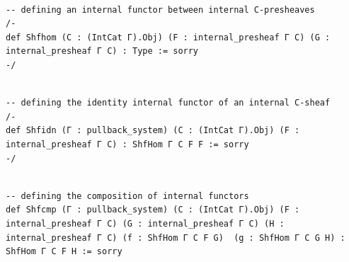 \documentclass{book}
\theoremstyle{definition}
\newcounter{lcounter}
\begin{document}
\begin{center}
\begin{tcolorbox}[width=5in,colback={white},title={\begin{center}\texttt{Lean \thelcounter} \addtocounter{lcounter}{1}  \end{center}},colbacktitle=Blue,coltitle=black]
\begin{verbatim}

-- defining an internal functor between internal C-presheaves
/-
def Shfhom (C : (IntCat Γ).Obj) (F : internal_presheaf Γ C) (G : internal_presheaf Γ C) : Type := sorry
-/

\end{verbatim}
\end{tcolorbox}
\end{center}

\begin{center}
\begin{tcolorbox}[width=5in,colback={white},title={\begin{center}\texttt{Lean \thelcounter} \addtocounter{lcounter}{1}  \end{center}},colbacktitle=Blue,coltitle=black]
\begin{verbatim}

-- defining the identity internal functor of an internal C-sheaf
/-
def Shfidn (Γ : pullback_system) (C : (IntCat Γ).Obj) (F : internal_presheaf Γ C) : ShfHom Γ C F F := sorry
-/

\end{verbatim}
\end{tcolorbox}
\end{center}

\begin{center}
\begin{tcolorbox}[width=5in,colback={white},title={\begin{center}\texttt{Lean \thelcounter} \addtocounter{lcounter}{1}  \end{center}},colbacktitle=Blue,coltitle=black]
\begin{verbatim}

-- defining the composition of internal functors
def Shfcmp (Γ : pullback_system) (C : (IntCat Γ).Obj) (F : internal_presheaf Γ C) (G : internal_presheaf Γ C) (H : internal_presheaf Γ C) (f : ShfHom Γ C F G)  (g : ShfHom Γ C G H) : ShfHom Γ C F H := sorry

\end{verbatim}
\end{tcolorbox}
\end{center}
\end{document}
